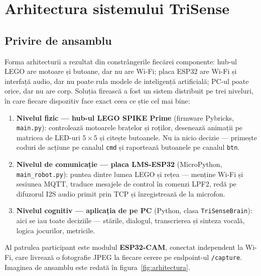 \chapter{Arhitectura sistemului TriSense}
\label{cap:arhitectura}

\section{Privire de ansamblu}

Forma arhitecturii a rezultat din constrângerile fiecărei componente: hub-ul LEGO are motoare și butoane, dar nu are Wi-Fi; placa ESP32 are Wi-Fi și interfață audio, dar nu poate rula modele de inteligență artificială; PC-ul poate orice, dar nu are corp. Soluția firească a fost un sistem distribuit pe trei niveluri, în care fiecare dispozitiv face exact ceea ce știe cel mai bine:

\begin{enumerate}
    \item \textbf{Nivelul fizic — hub-ul LEGO SPIKE Prime} (firmware Pybricks, \texttt{main.py}): controlează motoarele brațelor și roților, desenează animații pe matricea de LED-uri $5\times5$ și citește butoanele. Nu ia nicio decizie — primește coduri de acțiune pe canalul \texttt{cmd} și raportează butoanele pe canalul \texttt{btn}.
    \item \textbf{Nivelul de comunicație — placa LMS-ESP32} (MicroPython, \texttt{main\_robot.py}): puntea dintre lumea LEGO și rețea — menține Wi-Fi și sesiunea MQTT, traduce mesajele de control în comenzi LPF2, redă pe difuzorul I2S audio primit prin TCP și înregistrează de la microfon.
    \item \textbf{Nivelul cognitiv — aplicația de pe PC} (Python, clasa \texttt{TriSenseBrain}): aici se iau toate deciziile — stările, dialogul, transcrierea și sinteza vocală, logica jocurilor, metricile.
\end{enumerate}

Al patrulea participant este modulul \textbf{ESP32-CAM}, conectat independent la Wi-Fi, care livrează o fotografie JPEG la fiecare cerere pe endpoint-ul \texttt{/capture}. Imaginea de ansamblu este redată în figura~\ref{fig:arhitectura}.

